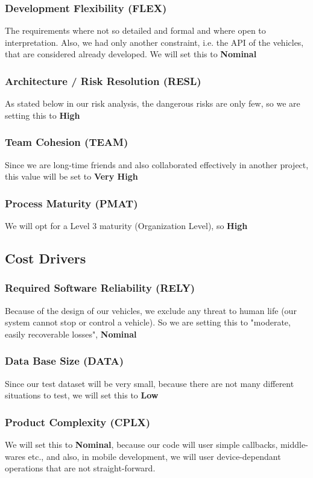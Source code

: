 \subsubsection{Development Flexibility (FLEX)}
The requirements where not so detailed and formal and where open to interpretation. Also, we had only another constraint, i.e. the API of the vehicles, that are considered already developed. We will set this to \textbf{Nominal}
\subsubsection{Architecture / Risk Resolution (RESL)} 
As stated below in our risk analysis, the dangerous risks are only few, so we are setting this to \textbf{High}
\subsubsection{Team Cohesion (TEAM)}
Since we are long-time friends and also collaborated effectively in another project, this value will be set to \textbf{Very High}
\subsubsection{Process Maturity (PMAT)}
We will opt for a Level 3 maturity (Organization Level), so \textbf{High}

\subsection{Cost Drivers}
\subsubsection{Required Software Reliability (RELY)}
Because of the design of our vehicles, we exclude any threat to human life (our system cannot stop or control a vehicle). So we are setting this to "moderate, easily recoverable losses", \textbf{Nominal}
\subsubsection{Data Base Size (DATA)}
Since our test dataset will be very small, because there are not many different situations to test, we will set this to \textbf{Low}
\subsubsection{Product Complexity (CPLX)}
We will set this to \textbf{Nominal}, because our code will user simple callbacks, middle-wares etc., and also, in mobile development, we will user device-dependant operations that are not straight-forward. 

